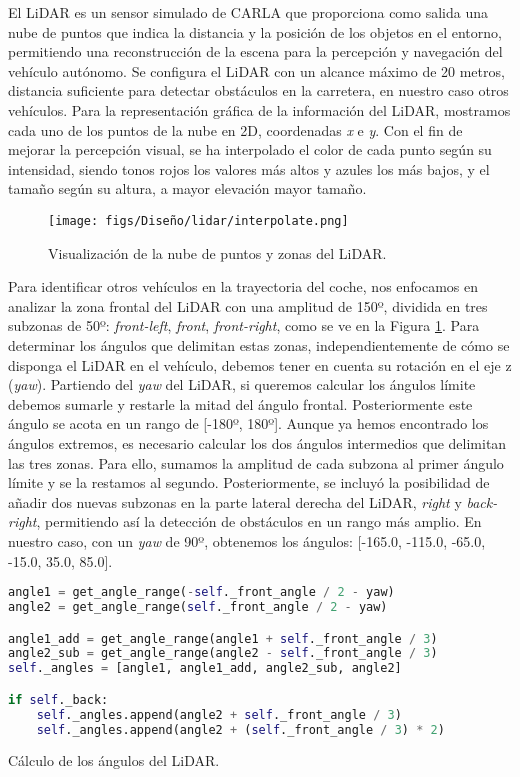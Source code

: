 El \ac{LiDAR} es un sensor simulado de CARLA que proporciona como salida una nube de puntos que indica la distancia y la posición de los objetos en el entorno, permitiendo una reconstrucción de la escena para la percepción y navegación del vehículo autónomo. Se configura el \ac{LiDAR} con un alcance máximo de 20 metros, distancia suficiente para detectar obstáculos en la carretera, en nuestro caso otros vehículos. Para la representación gráfica de la información del \ac{LiDAR}, mostramos cada uno de los puntos de la nube en 2D, coordenadas \textit{x} e \textit{y}. Con el fin de mejorar la percepción visual, se ha interpolado el color de cada punto según su intensidad, siendo tonos rojos los valores más altos y azules los más bajos, y el tamaño según su altura, a mayor elevación mayor tamaño.

\begin{figure}[ht]
\centering
\texttt{[image: figs/Diseño/lidar/interpolate.png]}
\caption{Visualización de la nube de puntos y zonas del \ac{LiDAR}.}
\label{fig:interpolate_lidar}
\end{figure}

Para identificar otros vehículos en la trayectoria del coche, nos enfocamos en analizar la zona frontal del \ac{LiDAR} con una amplitud de 150º, dividida en tres subzonas de 50º: \textit{front-left}, \textit{front}, \textit{front-right}, como se ve en la Figura \ref{fig:interpolate_lidar}. Para determinar los ángulos que delimitan estas zonas, independientemente de cómo se disponga el \ac{LiDAR} en el vehículo, debemos tener en cuenta su rotación en el eje z (\textit{yaw}). Partiendo del \textit{yaw} del \ac{LiDAR}, si queremos calcular los ángulos límite debemos sumarle y restarle la mitad del ángulo frontal. Posteriormente este ángulo se acota en un rango de [-180º, 180º]. Aunque ya hemos encontrado los ángulos extremos, es necesario calcular los dos ángulos intermedios que delimitan las tres zonas. Para ello, sumamos la amplitud de cada subzona al primer ángulo límite y se la restamos al segundo. Posteriormente, se incluyó la posibilidad de añadir dos nuevas subzonas en la parte lateral derecha del \ac{LiDAR}, \textit{right} y \textit{back-right}, permitiendo así la detección de obstáculos en un rango más amplio. En nuestro caso, con un \textit{yaw} de 90º, obtenemos los ángulos: [-165.0, -115.0, -65.0, -15.0, 35.0, 85.0].

\begin{code}[h]
\begin{lstlisting}[language=Python]
angle1 = get_angle_range(-self._front_angle / 2 - yaw)
angle2 = get_angle_range(self._front_angle / 2 - yaw)

angle1_add = get_angle_range(angle1 + self._front_angle / 3)
angle2_sub = get_angle_range(angle2 - self._front_angle / 3)        
self._angles = [angle1, angle1_add, angle2_sub, angle2]

if self._back:
	self._angles.append(angle2 + self._front_angle / 3)
	self._angles.append(angle2 + (self._front_angle / 3) * 2)
\end{lstlisting}
\caption[Cálculo de los ángulos de la zona del \ac{LiDAR}]{Cálculo de los ángulos del \ac{LiDAR}.}
\label{cod:angle_lidar}
\end{code}

